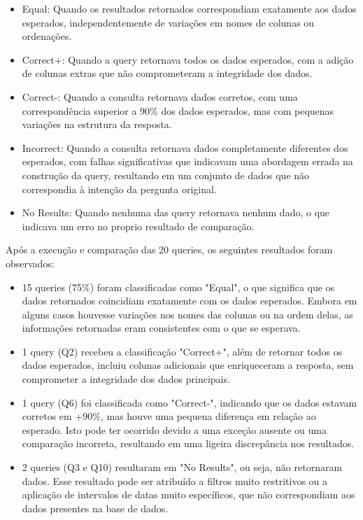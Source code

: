 \documentclass{article}
\begin{document}
\begin{itemize}
    \item Equal: Quando os resultados retornados correspondiam exatamente aos dados esperados, independentemente de variações em nomes de colunas ou ordenações.
    \item Correct+: Quando a query retornava todos os dados esperados, com a adição de colunas extras que não comprometeram a integridade dos dados.
    \item Correct-: Quando a consulta retornava dados corretos, com uma correspondência superior a 90\% dos dados esperados, mas com pequenas variações na estrutura da resposta.
    \item Incorrect: Quando a consulta retornava dados completamente diferentes dos esperados, com falhas significativas que indicavam uma abordagem errada na construção da query, resultando em um conjunto de dados que não correspondia à intenção da pergunta original.
    \item No Results: Quando nenhuma das query retornava nenhum dado, o que indicava um erro no proprio resultado de comparação.
\end{itemize}
Após a execução e comparação das 20 queries, os seguintes resultados foram observados:

\begin{itemize}
    \item 15 queries (75\%) foram classificadas como "Equal", o que significa que os dados retornados coincidiam exatamente com os dados esperados. Embora em alguns casos houvesse variações nos nomes das colunas ou na ordem delas, as informações retornadas eram consistentes com o que se esperava.
    \item 1 query (Q2) recebeu a classificação "Correct+", além de retornar todos os dados esperados, incluiu colunas adicionais que enriqueceram a resposta, sem comprometer a integridade dos dados principais.
    \item 1 query (Q6) foi classificada como "Correct-", indicando que os dados estavam corretos em +90\%, mas houve uma pequena diferença em relação ao esperado. Isto pode ter ocorrido devido a uma exceção ausente ou uma comparação incorreta, resultando em uma ligeira discrepância nos resultados.
    \item 2 queries (Q3 e Q10) resultaram em "No Results", ou seja, não retornaram dados. Esse resultado pode ser atribuído a filtros muito restritivos ou a aplicação de intervalos de datas muito específicos, que não correspondiam aos dados presentes na base de dados.
\end{itemize}
\end{document}
